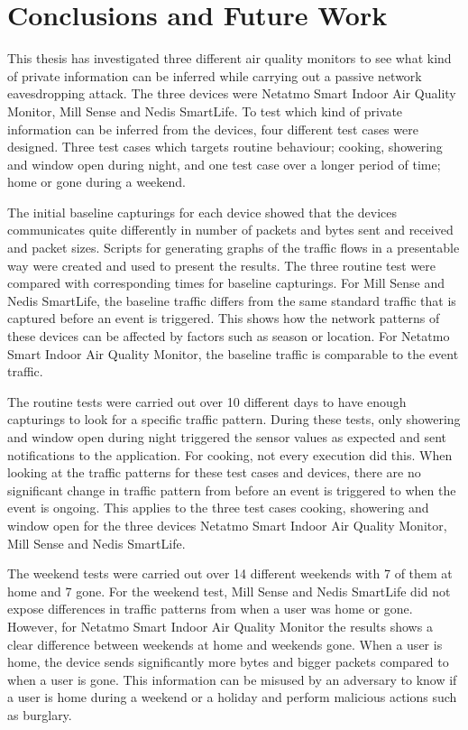 \chapter{Conclusions and Future Work}
This thesis has investigated three different air quality monitors to see what kind of private information can be inferred while carrying out a passive network eavesdropping attack. The three devices were Netatmo Smart Indoor Air Quality Monitor, Mill Sense and Nedis SmartLife. To test which kind of private information can be inferred from the devices, four different test cases were designed. Three test cases which targets routine behaviour; cooking, showering and window open during night, and one test case over a longer period of time; home or gone during a weekend. 

The initial baseline capturings for each device showed that the devices communicates quite differently in number of packets and bytes sent and received and packet sizes. Scripts for generating graphs of the traffic flows in a presentable way were created and used to present the results. The three routine test were compared with corresponding times for baseline capturings. For Mill Sense and Nedis SmartLife, the baseline traffic differs from the same standard traffic that is captured before an event is triggered. This shows how the network patterns of these devices can be affected by factors such as season or location. For Netatmo Smart Indoor Air Quality Monitor, the baseline traffic is comparable to the event traffic. 

The routine tests were carried out over 10 different days to have enough capturings to look for a specific traffic pattern. During these tests, only showering and window open during night triggered the sensor values as expected and sent notifications to the application. For cooking, not every execution did this. When looking at the traffic patterns for these test cases and devices, there are no significant change in traffic pattern from before an event is triggered to when the event is ongoing. This applies to the three test cases cooking, showering and window open for the three devices Netatmo Smart Indoor Air Quality Monitor, Mill Sense and Nedis SmartLife.  

The weekend tests were carried out over 14 different weekends with 7 of them at home and 7 gone. For the weekend test, Mill Sense and Nedis SmartLife did not expose differences in traffic patterns from when a user was home or gone. However, for Netatmo Smart Indoor Air Quality Monitor the results shows a clear difference between weekends at home and weekends gone. When a user is home, the device sends significantly more bytes and bigger packets compared to when a user is gone. This information can be misused by an adversary to know if a user is home during a weekend or a holiday and perform malicious actions such as burglary. 

